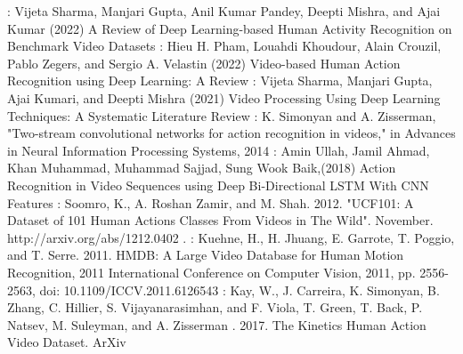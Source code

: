 \documentclass[twocolumn]{article}
\begin{document}
\begin{thebibliography}{00}
: Vijeta Sharma, Manjari Gupta, Anil Kumar Pandey, Deepti Mishra, and Ajai Kumar (2022) A Review of Deep Learning-based Human Activity Recognition on Benchmark Video Datasets
: Hieu H. Pham, Louahdi Khoudour, Alain Crouzil, Pablo Zegers, and Sergio A. Velastin (2022) Video-based Human Action Recognition using Deep Learning: A Review
: Vijeta Sharma, Manjari Gupta, Ajai Kumari, and Deepti Mishra (2021) Video Processing Using Deep Learning Techniques: A Systematic Literature Review
: K. Simonyan and A. Zisserman, "Two-stream convolutional networks for action recognition in videos," in Advances in Neural Information Processing Systems, 2014
: Amin Ullah, Jamil Ahmad, Khan Muhammad, Muhammad Sajjad, Sung Wook Baik,(2018) Action Recognition in Video Sequences using Deep Bi-Directional LSTM With CNN Features
: Soomro, K., A. Roshan Zamir, and M. Shah. 2012. "UCF101: A Dataset of 101 Human Actions Classes From Videos in The Wild". November. http://arxiv.org/abs/1212.0402 .
: Kuehne, H., H. Jhuang, E. Garrote, T. Poggio, and T. Serre. 2011. HMDB: A Large Video Database for Human Motion Recognition, 2011 International Conference on Computer Vision, 2011, pp. 2556-2563, doi: 10.1109/ICCV.2011.6126543
: Kay, W., J. Carreira, K. Simonyan, B. Zhang, C. Hillier, S. Vijayanarasimhan, and F. Viola, T. Green, T. Back, P. Natsev, M. Suleyman, and A. Zisserman . 2017. The Kinetics Human Action Video Dataset. ArXiv
\end{thebibliography}
\end{document}
